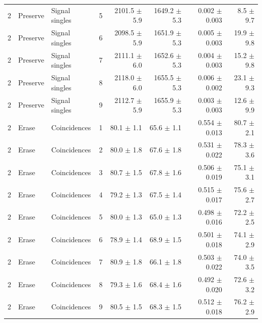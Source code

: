 \begin{tabular}{llllrrrr}
2 & Preserve & Signal singles & 5 & 2101.5 \ensuremath{\pm} 5.9 & 1649.2 \ensuremath{\pm} 5.3 & 0.002 \ensuremath{\pm} 0.003 & 8.5 \ensuremath{\pm} 9.7 \\
2 & Preserve & Signal singles & 6 & 2098.5 \ensuremath{\pm} 5.9 & 1651.9 \ensuremath{\pm} 5.3 & 0.005 \ensuremath{\pm} 0.003 & 19.9 \ensuremath{\pm} 9.8 \\
2 & Preserve & Signal singles & 7 & 2111.1 \ensuremath{\pm} 6.0 & 1652.6 \ensuremath{\pm} 5.3 & 0.004 \ensuremath{\pm} 0.003 & 15.2 \ensuremath{\pm} 9.8 \\
2 & Preserve & Signal singles & 8 & 2118.0 \ensuremath{\pm} 6.0 & 1655.5 \ensuremath{\pm} 5.3 & 0.006 \ensuremath{\pm} 0.002 & 23.1 \ensuremath{\pm} 9.3 \\
2 & Preserve & Signal singles & 9 & 2112.7 \ensuremath{\pm} 5.9 & 1655.9 \ensuremath{\pm} 5.3 & 0.003 \ensuremath{\pm} 0.003 & 12.6 \ensuremath{\pm} 9.9 \\
\midrule
2 & Erase & Coincidences & 1 & 80.1 \ensuremath{\pm} 1.1 & 65.6 \ensuremath{\pm} 1.1 & 0.554 \ensuremath{\pm} 0.013 & 80.7 \ensuremath{\pm} 2.1 \\
2 & Erase & Coincidences & 2 & 80.0 \ensuremath{\pm} 1.8 & 67.6 \ensuremath{\pm} 1.8 & 0.531 \ensuremath{\pm} 0.022 & 78.3 \ensuremath{\pm} 3.6 \\
2 & Erase & Coincidences & 3 & 80.7 \ensuremath{\pm} 1.5 & 67.8 \ensuremath{\pm} 1.6 & 0.506 \ensuremath{\pm} 0.019 & 75.1 \ensuremath{\pm} 3.1 \\
2 & Erase & Coincidences & 4 & 79.2 \ensuremath{\pm} 1.3 & 67.5 \ensuremath{\pm} 1.4 & 0.515 \ensuremath{\pm} 0.017 & 75.6 \ensuremath{\pm} 2.7 \\
2 & Erase & Coincidences & 5 & 80.0 \ensuremath{\pm} 1.3 & 65.0 \ensuremath{\pm} 1.3 & 0.498 \ensuremath{\pm} 0.016 & 72.2 \ensuremath{\pm} 2.5 \\
2 & Erase & Coincidences & 6 & 78.9 \ensuremath{\pm} 1.4 & 68.9 \ensuremath{\pm} 1.5 & 0.501 \ensuremath{\pm} 0.018 & 74.1 \ensuremath{\pm} 2.9 \\
2 & Erase & Coincidences & 7 & 80.9 \ensuremath{\pm} 1.8 & 66.1 \ensuremath{\pm} 1.8 & 0.503 \ensuremath{\pm} 0.022 & 74.0 \ensuremath{\pm} 3.5 \\
2 & Erase & Coincidences & 8 & 79.3 \ensuremath{\pm} 1.6 & 68.4 \ensuremath{\pm} 1.6 & 0.492 \ensuremath{\pm} 0.020 & 72.6 \ensuremath{\pm} 3.2 \\
2 & Erase & Coincidences & 9 & 80.5 \ensuremath{\pm} 1.5 & 68.3 \ensuremath{\pm} 1.5 & 0.512 \ensuremath{\pm} 0.018 & 76.2 \ensuremath{\pm} 2.9 \\

\end{tabular}
